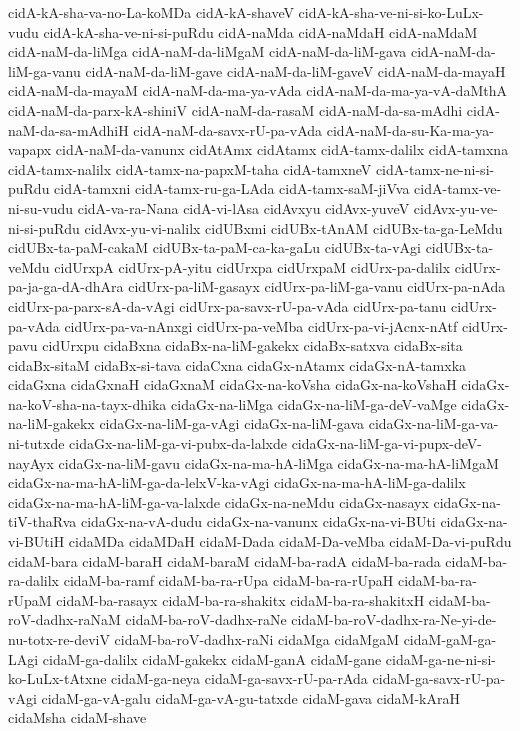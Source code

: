{cidA-kA-sha-va-no-La-koMDa
cidA-kA-shaveV
cidA-kA-sha-ve-ni-si-ko-LuLx-vudu
cidA-kA-sha-ve-ni-si-puRdu
cidA-naMda
cidA-naMdaH
cidA-naMdaM
cidA-naM-da-liMga
cidA-naM-da-liMgaM
cidA-naM-da-liM-gava
cidA-naM-da-liM-ga-vanu
cidA-naM-da-liM-gave
cidA-naM-da-liM-gaveV
cidA-naM-da-mayaH
cidA-naM-da-mayaM
cidA-naM-da-ma-ya-vAda
cidA-naM-da-ma-ya-vA-daMthA
cidA-naM-da-parx-kA-shiniV
cidA-naM-da-rasaM
cidA-naM-da-sa-mAdhi
cidA-naM-da-sa-mAdhiH
cidA-naM-da-savx-rU-pa-vAda
cidA-naM-da-su-Ka-ma-ya-vapapx
cidA-naM-da-vanunx
cidAtAmx
cidAtamx
cidA-tamx-dalilx
cidA-tamxna
cidA-tamx-nalilx
cidA-tamx-na-papxM-taha
cidA-tamxneV
cidA-tamx-ne-ni-si-puRdu
cidA-tamxni
cidA-tamx-ru-ga-LAda
cidA-tamx-saM-jiVva
cidA-tamx-ve-ni-su-vudu
cidA-va-ra-Nana
cidA-vi-lAsa
cidAvxyu
cidAvx-yuveV
cidAvx-yu-ve-ni-si-puRdu
cidAvx-yu-vi-nalilx
cidUBxmi
cidUBx-tAnAM
cidUBx-ta-ga-LeMdu
cidUBx-ta-paM-cakaM
cidUBx-ta-paM-ca-ka-gaLu
cidUBx-ta-vAgi
cidUBx-ta-veMdu
cidUrxpA
cidUrx-pA-yitu
cidUrxpa
cidUrxpaM
cidUrx-pa-dalilx
cidUrx-pa-ja-ga-dA-dhAra
cidUrx-pa-liM-gasayx
cidUrx-pa-liM-ga-vanu
cidUrx-pa-nAda
cidUrx-pa-parx-sA-da-vAgi
cidUrx-pa-savx-rU-pa-vAda
cidUrx-pa-tanu
cidUrx-pa-vAda
cidUrx-pa-va-nAnxgi
cidUrx-pa-veMba
cidUrx-pa-vi-jAcnx-nAtf
cidUrx-pavu
cidUrxpu
cidaBxna
cidaBx-na-liM-gakekx
cidaBx-satxva
cidaBx-sita
cidaBx-sitaM
cidaBx-si-tava
cidaCxna
cidaGx-nAtamx
cidaGx-nA-tamxka
cidaGxna
cidaGxnaH
cidaGxnaM
cidaGx-na-koVsha
cidaGx-na-koVshaH
cidaGx-na-koV-sha-na-tayx-dhika
cidaGx-na-liMga
cidaGx-na-liM-ga-deV-vaMge
cidaGx-na-liM-gakekx
cidaGx-na-liM-ga-vAgi
cidaGx-na-liM-gava
cidaGx-na-liM-ga-va-ni-tutxde
cidaGx-na-liM-ga-vi-pubx-da-lalxde
cidaGx-na-liM-ga-vi-pupx-deV-nayAyx
cidaGx-na-liM-gavu
cidaGx-na-ma-hA-liMga
cidaGx-na-ma-hA-liMgaM
cidaGx-na-ma-hA-liM-ga-da-lelxV-ka-vAgi
cidaGx-na-ma-hA-liM-ga-dalilx
cidaGx-na-ma-hA-liM-ga-va-lalxde
cidaGx-na-neMdu
cidaGx-nasayx
cidaGx-na-tiV-thaRva
cidaGx-na-vA-dudu
cidaGx-na-vanunx
cidaGx-na-vi-BUti
cidaGx-na-vi-BUtiH
cidaMDa
cidaMDaH
cidaM-Dada
cidaM-Da-veMba
cidaM-Da-vi-puRdu
cidaM-bara
cidaM-baraH
cidaM-baraM
cidaM-ba-radA
cidaM-ba-rada
cidaM-ba-ra-dalilx
cidaM-ba-ramf
cidaM-ba-ra-rUpa
cidaM-ba-ra-rUpaH
cidaM-ba-ra-rUpaM
cidaM-ba-rasayx
cidaM-ba-ra-shakitx
cidaM-ba-ra-shakitxH
cidaM-ba-roV-dadhx-raNaM
cidaM-ba-roV-dadhx-raNe
cidaM-ba-roV-dadhx-ra-Ne-yi-de-nu-totx-re-deviV
cidaM-ba-roV-dadhx-raNi
cidaMga
cidaMgaM
cidaM-gaM-ga-LAgi
cidaM-ga-dalilx
cidaM-gakekx
cidaM-ganA
cidaM-gane
cidaM-ga-ne-ni-si-ko-LuLx-tAtxne
cidaM-ga-neya
cidaM-ga-savx-rU-pa-rAda
cidaM-ga-savx-rU-pa-vAgi
cidaM-ga-vA-galu
cidaM-ga-vA-gu-tatxde
cidaM-gava
cidaM-kAraH
cidaMsha
cidaM-shave
}
